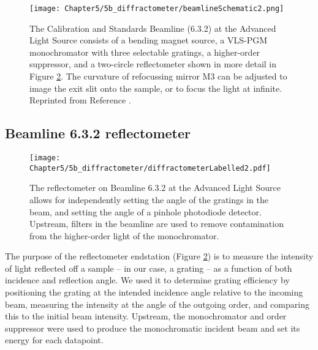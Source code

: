 \begin{figure}[htbp] %
   \centering
   \texttt{[image: Chapter5/5b\_diffractometer/beamlineSchematic2.png]} 
   \caption[The Calibration and Standards Beamline (6.3.2) at the Advanced Light Source consists of a bending magnet source, a VLS-PGM monochromator with three selectable gratings, a higher-order suppressor, and a two-circle reflectometer.]{The Calibration and Standards Beamline (6.3.2) at the Advanced Light Source consists of a bending magnet source, a VLS-PGM monochromator with three selectable gratings, a higher-order suppressor, and a two-circle reflectometer shown in more detail in Figure \ref{5b}.  The curvature of refocussing mirror M3 can be adjusted to image the exit slit onto the sample, or to focus the light at infinite.  Reprinted from Reference \cite{bl632}.}
   \label{5b-a}
\end{figure}

\subsection{Beamline 6.3.2 reflectometer}

\begin{figure}[htbp] %
   \centering
   \texttt{[image: Chapter5/5b\_diffractometer/diffractometerLabelled2.pdf]} 
   \caption[The reflectometer on Beamline 6.3.2 at the Advanced Light Source allows for independently setting the angle of the gratings in the beam, and setting the angle of a pinhole photodiode detector.]{The reflectometer on Beamline 6.3.2 at the Advanced Light Source allows for independently setting the angle of the gratings in the beam, and setting the angle of a pinhole photodiode detector.  Upstream, filters in the beamline are used to remove contamination from the higher-order light of the monochromator. }
   \label{5b}
\end{figure}

The purpose of the reflectometer endstation (Figure \ref{5b}) is to measure the intensity of light reflected off a sample -- in our case, a grating -- as a function of both incidence and reflection angle.  We used it to determine grating efficiency by positioning the grating at the intended incidence angle relative to the incoming beam,  measuring the intensity at the angle of the outgoing order, and comparing this to the initial beam intensity.  Upstream, the monochromator and order suppressor were used to produce the monochromatic incident beam and set its energy for each datapoint.

